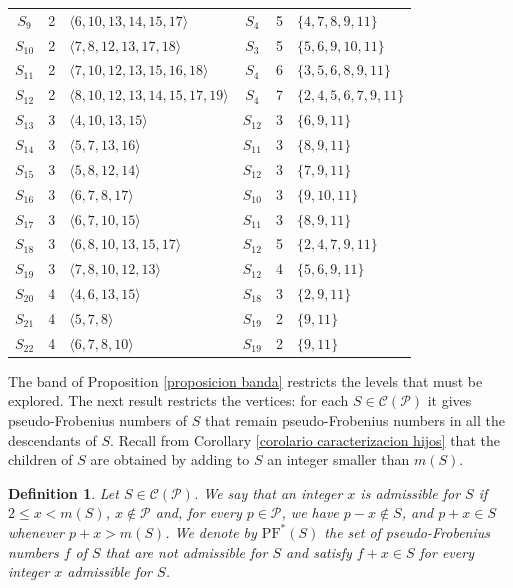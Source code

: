 \documentclass[11pt]{article}
\newtheorem{definition}[theorem]{Definition}
\numberwithin{equation}{section}
\newcommand{\CP}{\mathcal C(\mathcal P)}
\newcommand{\PFs}{\mathrm{PF}^{*}}
\begin{document}
{\begin{longtable}{@{}cclccl@{}}
$S_{9}$ & 2 & $\langle 6, 10, 13, 14, 15, 17\rangle$ & $S_{4}$ & 5 & $\{4, 7, 8, 9, 11\}$\\
$S_{10}$ & 2 & $\langle 7, 8, 12, 13, 17, 18\rangle$ & $S_{3}$ & 5 & $\{5, 6, 9, 10, 11\}$\\
$S_{11}$ & 2 & $\langle 7, 10, 12, 13, 15, 16, 18\rangle$ & $S_{4}$ & 6 & $\{3, 5, 6, 8, 9, 11\}$\\
$S_{12}$ & 2 & $\langle 8, 10, 12, 13, 14, 15, 17, 19\rangle$ & $S_{4}$ & 7 & $\{2, 4, 5, 6, 7, 9, 11\}$\\
$S_{13}$ & 3 & $\langle 4, 10, 13, 15\rangle$ & $S_{12}$ & 3 & $\{6, 9, 11\}$\\
$S_{14}$ & 3 & $\langle 5, 7, 13, 16\rangle$ & $S_{11}$ & 3 & $\{8, 9, 11\}$\\
$S_{15}$ & 3 & $\langle 5, 8, 12, 14\rangle$ & $S_{12}$ & 3 & $\{7, 9, 11\}$\\
$S_{16}$ & 3 & $\langle 6, 7, 8, 17\rangle$ & $S_{10}$ & 3 & $\{9, 10, 11\}$\\
$S_{17}$ & 3 & $\langle 6, 7, 10, 15\rangle$ & $S_{11}$ & 3 & $\{8, 9, 11\}$\\
$S_{18}$ & 3 & $\langle 6, 8, 10, 13, 15, 17\rangle$ & $S_{12}$ & 5 & $\{2, 4, 7, 9, 11\}$\\
$S_{19}$ & 3 & $\langle 7, 8, 10, 12, 13\rangle$ & $S_{12}$ & 4 & $\{5, 6, 9, 11\}$\\
$S_{20}$ & 4 & $\langle 4, 6, 13, 15\rangle$ & $S_{18}$ & 3 & $\{2, 9, 11\}$\\
$S_{21}$ & 4 & $\langle 5, 7, 8\rangle$ & $S_{19}$ & 2 & $\{9, 11\}$\\
$S_{22}$ & 4 & $\langle 6, 7, 8, 10\rangle$ & $S_{19}$ & 2 & $\{9, 11\}$\\
\end{longtable}
}

The band of Proposition \ref{proposicion banda} restricts the levels that must be explored. The next result restricts the vertices: for each $S\in\CP$ it gives pseudo-Frobenius numbers of $S$ that remain pseudo-Frobenius numbers in all the descendants of $S$. Recall from Corollary \ref{corolario caracterizacion hijos} that the children of $S$ are obtained by adding to $S$ an integer smaller than $m(S)$.

\begin{definition}\label{definicion admisible}
Let $S\in\CP$. We say that an integer $x$ is \textit{admissible} for $S$ if $2\leq x<m(S)$, $x\notin\mathcal P$ and, for every $p\in\mathcal P$, we have $p-x\notin S$, and $p+x\in S$ whenever $p+x>m(S)$. We denote by $\PFs(S)$ the set of pseudo-Frobenius numbers $f$ of $S$ that are not admissible for $S$ and satisfy $f+x\in S$ for every integer $x$ admissible for $S$.
\end{definition}
\end{document}
